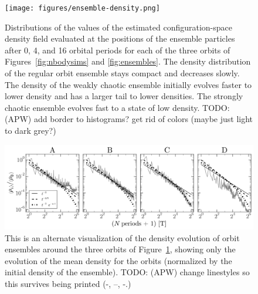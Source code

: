 \documentclass[letterpaper,12pt,preprint]{aastex}
\newcommand{\todo}[2]{{\color{red} TODO: (\MakeUppercase{#1}) #2}}
\begin{document}
\clearpage
\begin{figure}[p]
\begin{center}
\texttt{[image: figures/ensemble-density.png]}
\caption{ Distributions of the values of the estimated configuration-space density field evaluated at the positions of the ensemble particles after 0, 4, and 16 orbital periods for each of the three orbits of Figures~\ref{fig:nbodysims} and \ref{fig:ensembles}. The density distribution of the regular orbit ensemble stays compact and decreases slowly. The density of the weakly chaotic ensemble initially evolves faster to lower density and has a larger tail to lower densities. The strongly chaotic ensemble evolves fast to a state of low density. \todo{apw}{add border to histograms? get rid of colors (maybe just light to dark grey?)}} \label{fig:ensemble-density}
\end{center}
\end{figure}

\clearpage
\begin{figure}[p]
\begin{center}
\includegraphics[width=\textwidth]{figures/ensemble-densities.png}
\caption{This is an alternate visualization of the density evolution of orbit ensembles around the three orbits of Figure~\ref{fig:ensemble-density}, showing only the evolution of the mean density for the orbits (normalized by the initial density of the ensemble). \todo{apw}{change linestyles so this survives being printed (-, --, -.)}} 
\label{fig:densities}
\end{center}
\end{figure}
\end{document}
